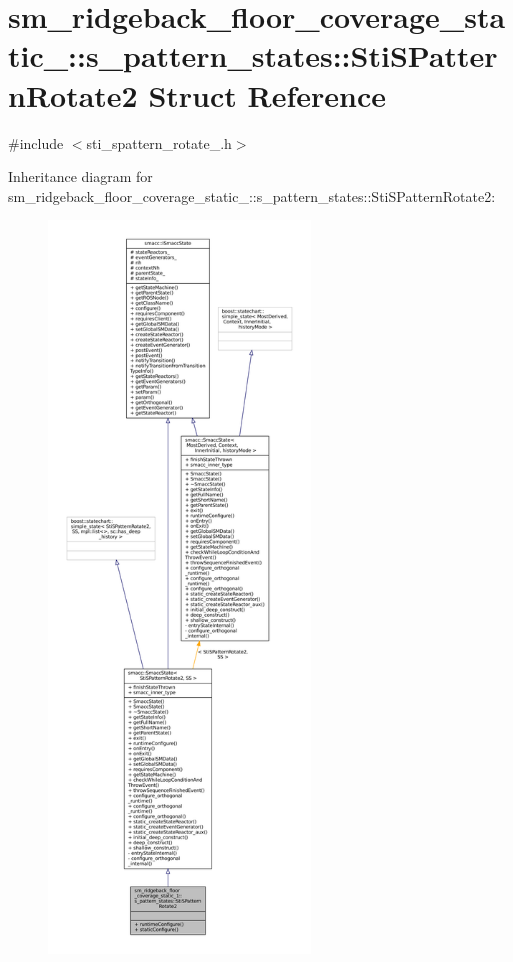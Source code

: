 \hypertarget{structsm__ridgeback__floor__coverage__static__1_1_1s__pattern__states_1_1StiSPatternRotate2}{}\section{sm\+\_\+ridgeback\+\_\+floor\+\_\+coverage\+\_\+static\+\_\+:\+:s\+\_\+pattern\+\_\+states\+:\+:Sti\+S\+Pattern\+Rotate2 Struct Reference}
\label{structsm__ridgeback__floor__coverage__static__1_1_1s__pattern__states_1_1StiSPatternRotate2}


{\ttfamily \#include $<$sti\+\_\+spattern\+\_\+rotate\+\_.\+h$>$}



Inheritance diagram for sm\+\_\+ridgeback\+\_\+floor\+\_\+coverage\+\_\+static\+\_\+:\+:s\+\_\+pattern\+\_\+states\+:\+:Sti\+S\+Pattern\+Rotate2\+:
\nopagebreak
\begin{figure}[H]
\begin{center}
\leavevmode
\includegraphics[height=550pt]{structsm__ridgeback__floor__coverage__static__1_1_1s__pattern__states_1_1StiSPatternRotate2__inherit__graph}
\end{center}
\end{figure}


